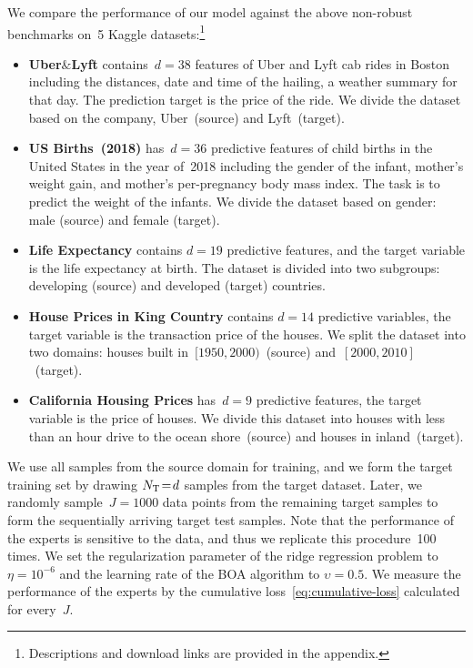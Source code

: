 \documentclass{article}
\begin{document}
We compare the performance of our model against the above non-robust benchmarks on~5 Kaggle datasets:\footnote{Descriptions and download links are provided in the appendix.}
    \begin{itemize}[leftmargin = 3mm, itemsep=0.5mm]
    \vspace{-0.3cm}
          \item \textbf{Uber$\&$Lyft} contains~$d\!=\!38$ features of Uber and Lyft cab rides in Boston including the distances, date and time of the hailing, a weather summary for that day. The prediction target is the price of the ride. We divide the dataset based on the company, Uber~(source) and Lyft~(target). 
         
        \item \textbf{US Births~(2018)} has~$d=36$ predictive features of child births in the United States in the year of~2018 including the gender of the infant, mother's weight gain, and mother's per-pregnancy body mass index. The task is to predict the weight of the infants. We divide the dataset based on gender: male (source) and female (target).
        
       \item \textbf{Life Expectancy} contains $d = 19$ predictive features, and the target variable is the life expectancy at birth. The dataset is divided into  
       two subgroups: developing (source) and developed (target) countries.
        
        \item \textbf{House Prices in King Country} contains $d \!=\! 14$ predictive variables, the target variable is the transaction price of the houses. We split the dataset into two domains: houses built in~$[1950, 2000)$~(source) and~$[2000, 2010]$~(target).
         \item \textbf{California Housing Prices} has~$d = 9$ predictive features, the target variable is the price of houses. We divide this dataset into houses with less than an hour drive to the ocean shore~(source) and houses in inland~(target).
    \end{itemize}
    \vspace{-.3cm}
    We use all samples from the source domain for training, and we form the target training set by drawing $N_{\rm T}\!=\!d$ samples from the target dataset.
    Later, we randomly sample~$J\!=\!1000$ data points from the remaining target samples to form the sequentially arriving target test samples. 
    Note that the performance of the experts is sensitive to the data, and thus we replicate this procedure~100 times.
    We set the regularization parameter of the ridge regression problem to $\eta = 10^{-6}$ and the learning rate of the BOA algorithm to $\upsilon = 0.5$.
    We measure the performance of the experts by the cumulative loss~\eqref{eq:cumulative-loss} calculated for every~$J$.
    
\end{document}
